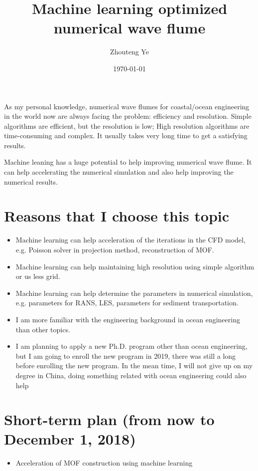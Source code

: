 \documentclass[11pt]{article}
\author{Zhouteng Ye}
\date{\today}
\title{Machine learning optimized numerical wave flume}
\begin{document}
\maketitle
As my personal knowledge, numerical wave flumes for coastal/ocean engineering in
the world now are always facing the problem: efficiency and resolution. Simple
algorithms are efficient, but the resolution is low; High resolution algorithms
are time-consuming and complex. It usually takes very long time to get a
satisfying results.

Machine leaning has a huge potential to help improving numerical wave flume. It
can help accelerating the numerical simulation and also help improving the
numerical results. 

\section{Reasons that I choose this topic}
\label{sec:orgb4e481a}

\begin{itemize}
\item Machine learning can help acceleration of the iterations in the CFD model, e.g.
Poisson solver in projection method, reconstruction of MOF.
\item Machine learning can help maintaining high resolution using simple algorithm
or us less grid.
\item Machine learning can help determine the parameters in numerical simulation,
e.g. parameters for RANS, LES, parameters for sediment transportation.
\item I am more familiar with the engineering background in ocean engineering than
other topics.
\item I am planning to apply a new Ph.D. program other than ocean engineering, but I
am going to enroll the new program in 2019, there was still a long before
enrolling the new program. In the mean time, I will not give up on my degree
in China, doing something related with ocean engineering could also help
\end{itemize}

\section{Short-term plan (from now to December 1, 2018)}
\label{sec:org4e1cb2c}

\begin{itemize}
\item Acceleration of MOF construction using machine learning
\end{itemize}
\end{document}
